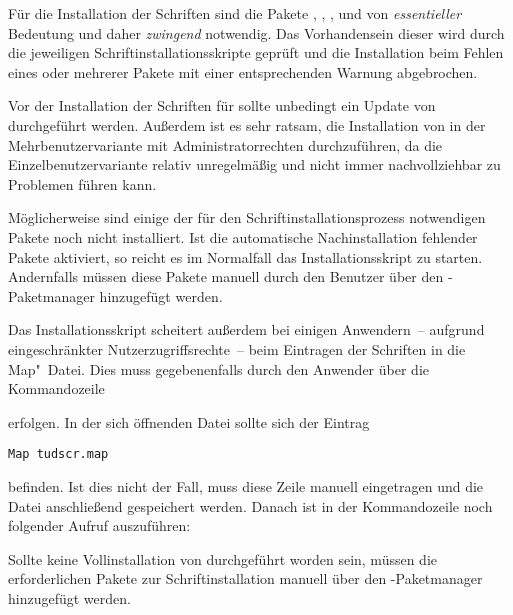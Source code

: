 
Für die Installation der Schriften sind die Pakete , 
, ,  und 
 von \emph{essentieller} Bedeutung und daher \emph{zwingend} 
notwendig. Das Vorhandensein dieser wird durch die jeweiligen 
Schriftinstallationsskripte geprüft und die Installation beim Fehlen eines oder 
mehrerer Pakete mit einer entsprechenden Warnung abgebrochen.



Vor der Installation der Schriften für \TUDScript sollte unbedingt ein Update 
von \MiKTeX durchgeführt werden. Außerdem ist es sehr ratsam, die Installation 
von \MiKTeX in der Mehrbenutzervariante mit Administratorrechten durchzuführen, 
da die Einzelbenutzervariante relativ unregelmäßig und nicht immer 
nachvollziehbar zu Problemen führen kann. 

Möglicherweise sind einige der für den Schriftinstallationsprozess notwendigen 
Pakete noch nicht installiert. Ist die automatische Nachinstallation fehlender 
Pakete aktiviert, so reicht es im Normalfall das Installationsskript zu 
starten. Andernfalls müssen diese Pakete manuell durch den Benutzer über den 
\MiKTeX-Paketmanager hinzugefügt werden.

Das Installationsskript scheitert außerdem bei einigen Anwendern~-- aufgrund 
eingeschränkter Nutzerzugriffsrechte~-- beim Eintragen der Schriften in die 
Map"~Datei. Dies muss gegebenenfalls durch den Anwender über die Kommandozeile 
%
\begin{quoting}
\RET
\end{quoting}
%
erfolgen. In der sich öffnenden Datei sollte sich der Eintrag 
%
\begin{quoting}
\texttt{Map~tudscr.map}
\end{quoting}
%
befinden. Ist dies nicht der Fall, muss diese Zeile manuell eingetragen und die 
Datei anschließend gespeichert werden. Danach ist in der Kommandozeile noch 
folgender Aufruf auszuführen:
%
\begin{quoting}
\RET
\end{quoting}



Sollte keine Vollinstallation von \TeXLive durchgeführt worden sein, müssen die 
erforderlichen Pakete zur Schriftinstallation manuell über den 
\TeXLive-Paketmanager hinzugefügt werden.

